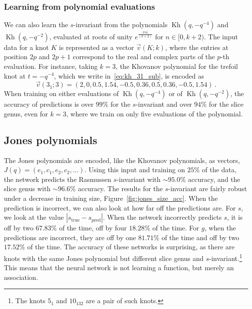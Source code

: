 \documentclass[11pt]{article}
\DeclareMathOperator{\Kh}{Kh}
\numberwithin{equation}{section}
\begin{document}
\subsubsection{Learning from polynomial evaluations}
We can also learn the $s$-invariant from the polynomials $\Kh(q, -q^{-4})$ and $\Kh(q, -q^{-2})$, evaluated at roots of unity $e^{\frac{\pi i n}{(k+2)}}$ for $n \in [0, k+2)$.
The input data for a knot $K$ is represented as a vector $\vec{v}(K;k)$, where the entries at position $2p$ and $2p+1$ correspond to the real and complex parts of the $p$-th evaluation.
For instance, taking $k=3$, the Khovanov polynomial for the trefoil knot at $t=-q^{-4}$, which we write in~\eqref{eq:kh_31_sub}, is encoded as
\begin{equation}
   \vec{v}(3_1;3) = \left(2, 0, 0.5, 1.54, -0.5, 0.36, 0.5, 0.36, -0.5, 1.54 \right) \,.
\end{equation}
When training on either evaluations of $\Kh(q, -q^{-4})$ or of $\Kh(q, -q^{-2})$, the accuracy of predictions is over $99\%$ for the $s$-invariant and over $94\%$ for the slice genus, even for $k=3$, where we train on only five evaluations of the polynomial. 

\subsection{Jones polynomials}
The Jones polynomials are encoded, like the Khovanov polynomials, as vectors, $J(q) = (e_1, c_1, e_2, c_2, \ldots)$.
Using this input and training on $25\%$ of the data, the network predicts the Rasmussen $s$-invariant with $\sim 95.0\%$ accuracy, and the slice genus with $\sim 96.6\%$ accuracy.
The results for the $s$-invariant are fairly robust under a decrease in training size, Figure~\ref{fig:jones_size_acc}.
When the prediction is incorrect, we can also look at how far off the predictions are. For $s$, we look at the value $|s_\text{true}-s_\text{pred}|$.
When the network incorrectly predicts $s$, it is off by two $67.83\%$ of the time, off by four $18.28\%$ of the time. For $g$, when the predictions are incorrect, they are off by one $81.71\%$ of the time and off by two $17.52\%$ of the time.  The accuracy of these networks is surprising, as there are knots with the same Jones polynomial but different slice genus and $s$-invariant.\footnote{The knots $5_1$ and $10_{132}$ are a pair of such knots.} This means that the neural network is not learning a function, but merely an association.
\end{document}
